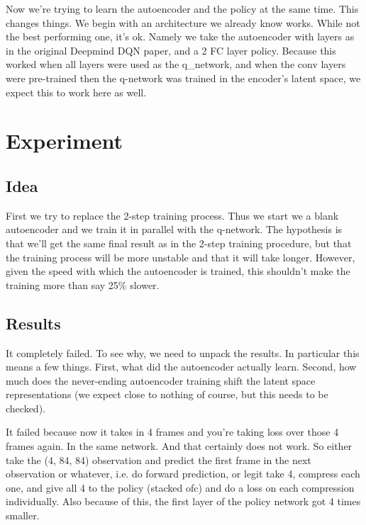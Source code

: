 \documentclass{article}
\begin{document}
Now we're trying to learn the autoencoder and the policy at the same time.
This changes things.
We begin with an architecture we already know works.
While not the best performing one, it's ok.
Namely we take the autoencoder with layers as in the original Deepmind DQN paper,
and a 2 FC layer policy.
Because this worked when all layers were used as the q_network, and when
the conv layers were pre-trained then the q-network was trained in the encoder's latent space,
we expect this to work here as well.
\section{Experiment}
\subsection{Idea}
First we try to replace the 2-step training process.
Thus we start we a blank autoencoder and we train it in parallel with the q-network.
The hypothesis is that we'll get the same final result as in the 2-step training procedure,
but that the training process will be more unstable and that it will take longer.
However, given the speed with which the autoencoder is trained, 
this shouldn't make the training more than say 25\% slower.


\subsection{Results}
It completely failed.
To see why, we need to unpack the results. In particular this means a few things.
First, what did the autoencoder actually learn.
Second, how much does the never-ending autoencoder training shift the latent space
representations (we expect close to nothing of course, but this needs to be checked).

It failed because now it takes in 4 frames and you're taking loss over those 4 frames again.
In the same network.
And that certainly does not work.
So either take the (4, 84, 84) observation and predict the first frame in the next observation or whatever,
i.e. do forward prediction, or legit take 4, compress each one, and give all 4 to the policy (stacked ofc) and do
a loss on each compression individually.
Also because of this, the first layer of the policy network got 4 times smaller.
\end{document}
